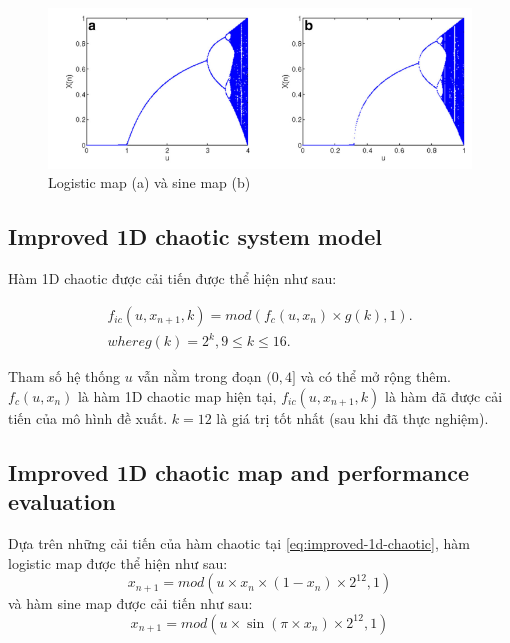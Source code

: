\begin{figure}
    \centering
    \includegraphics[scale=0.7]{graphics/chapter-1/chap1-logistic_sine_map.png}
    \caption{Logistic map (a) và sine map (b)}
    \label{fig:chap1-logistic_sine_map}
\end{figure}

\subsection{Improved 1D chaotic system model}

Hàm 1D chaotic được cải tiến được thể hiện như sau:

\begin{equation}
\label{eq:improved-1d-chaotic}
\begin{multlined}
f_{ic}(u,x_{n+1},k) = mod(f_c(u,x_n) \times g(k),1). \\
where g(k) = 2^k, 9 \leq k \leq 16.
\end{multlined}
\end{equation}

Tham số hệ thống $u$ vẫn nằm trong đoạn $(0,4]$ và có thể mở rộng thêm. $f_c(u,x_n)$ là hàm 1D chaotic map hiện tại, $f_{ic}(u,x_{n+1},k)$ là hàm đã được cải tiến của mô hình đề xuất. $k=12$ là giá trị tốt nhất (sau khi đã thực nghiệm).

\subsection{Improved 1D chaotic map and performance evaluation}

Dựa trên những cải tiến của hàm chaotic tại \ref{eq:improved-1d-chaotic}, hàm logistic map được thể hiện như sau:
\begin{equation}
\label{eq:improved_logistic_map}
x_{n+1} = mod(u \times x_n \times (1 - x_n ) \times 2^{12}, 1)
\end{equation}
và hàm sine map được cải tiến như sau:
\begin{equation}
\label{eq:improved_sine_map}
x_{n+1} = mod( u \times \sin(\pi \times x_n) \times 2^{12},1)
\end{equation}

